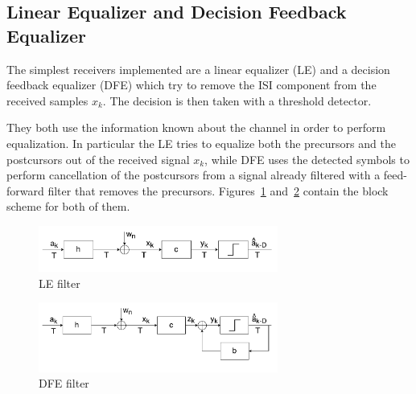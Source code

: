 \documentclass[10pt]{article}
\begin{document}
\subsection*{Linear Equalizer and Decision Feedback Equalizer}
The simplest receivers implemented are a linear equalizer (LE) and a decision feedback equalizer (DFE) which try to remove the ISI component from the received samples $x_k$. The decision is then taken with a threshold detector. 

They both use the information known about the channel in order to perform equalization. In particular the LE tries to equalize both the precursors and the postcursors out of the received signal $x_k$, while DFE uses the detected symbols to perform cancellation of the postcursors from a signal already filtered with a feed-forward filter that removes the precursors. Figures~\ref{fig:LE} and~\ref{fig:DFE} contain the block scheme for both of them. 
\begin{figure}[h!]
	\centering
	\includegraphics[width = 0.7\textwidth]{LE}
	\caption{LE filter}
	\label{fig:LE}
\end{figure}

\begin{figure}[h!]
	\centering
	\includegraphics[width=0.7\textwidth]{DFE}
	\caption{DFE filter}
	\label{fig:DFE}
\end{figure}
\end{document}
